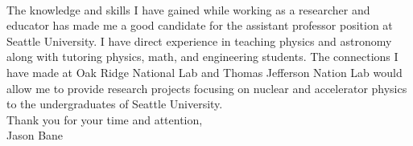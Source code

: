 \documentclass[12pt,letterpaper]{article}
\begin{document}
\paragraph{}The knowledge and skills I have gained while working as a researcher and educator has made me a good candidate for the assistant professor position at Seattle University. I have direct experience in teaching physics and astronomy along with tutoring physics, math, and engineering students.  The connections I have made at Oak Ridge National Lab and Thomas Jefferson Nation Lab would allow me to provide research projects focusing on nuclear and accelerator physics to the undergraduates of Seattle University.
\\

\noindent Thank you for your time and attention,\\
\noindent Jason Bane
\end{document}

